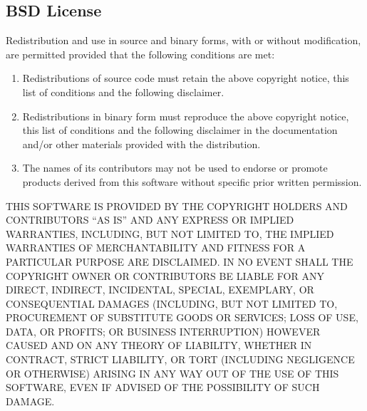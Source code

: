 \documentclass[11pt]{book}
\begin{document}
\subsection{BSD License}

Redistribution and use in source and binary forms, with or without
modification, are permitted provided that the following conditions
are met:

\begin{enumerate}[1.]
\item
Redistributions of source code must retain the above copyright
notice, this list of conditions and the following disclaimer.
\item
Redistributions in binary form must reproduce the above copyright
notice, this list of conditions and the following disclaimer in the
documentation and/or other materials provided with the distribution.
\item
The names of its contributors may not be used to endorse or promote 
products derived from this software without specific prior written 
permission.
\end{enumerate}

\noindent
THIS SOFTWARE IS PROVIDED BY THE COPYRIGHT HOLDERS AND CONTRIBUTORS
``AS IS'' AND ANY EXPRESS OR IMPLIED WARRANTIES, INCLUDING, BUT NOT
LIMITED TO, THE IMPLIED WARRANTIES OF MERCHANTABILITY AND FITNESS FOR
A PARTICULAR PURPOSE ARE DISCLAIMED.  IN NO EVENT SHALL THE COPYRIGHT
OWNER OR CONTRIBUTORS BE LIABLE FOR ANY DIRECT, INDIRECT, INCIDENTAL, SPECIAL,
EXEMPLARY, OR CONSEQUENTIAL DAMAGES (INCLUDING, BUT NOT LIMITED TO,
PROCUREMENT OF SUBSTITUTE GOODS OR SERVICES; LOSS OF USE, DATA, OR
PROFITS; OR BUSINESS INTERRUPTION) HOWEVER \mbox{} CAUSED AND ON ANY THEORY OF
LIABILITY, WHETHER IN CONTRACT, STRICT LIABILITY, OR TORT (INCLUDING
NEGLIGENCE OR OTHERWISE) ARISING IN ANY WAY OUT OF THE USE OF THIS
SOFTWARE, EVEN IF ADVISED OF THE POSSIBILITY OF SUCH DAMAGE.

\pagebreak




\begin{small}
\printindex
\end{small}
\end{document}
